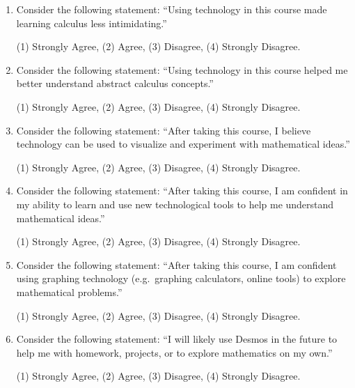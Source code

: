 \documentclass[11pt]{article}
\begin{document}
\begin{enumerate}[{$\qquad 1.]
\item Consider the following statement: ``Using technology in this course made learning calculus less intimidating.''
\begin{center} 
(1) Strongly Agree, \qquad (2) Agree, \qquad (3) Disagree, \qquad (4) Strongly Disagree. \end{center}

\item Consider the following statement: ``Using technology in this course helped me better understand abstract calculus concepts.''
\begin{center} 
(1) Strongly Agree, \qquad (2) Agree, \qquad (3) Disagree, \qquad (4) Strongly Disagree. \end{center}

\item Consider the following statement: ``After taking this course, I believe technology can be used to visualize and experiment with mathematical ideas.''
\begin{center} 
(1) Strongly Agree, \qquad (2) Agree, \qquad (3) Disagree, \qquad (4) Strongly Disagree. \end{center}

	\pagebreak 

\thispagestyle{empty}

\item Consider the following statement: ``After taking this course, I am confident in my ability to learn and use new technological tools to help me understand mathematical ideas.''
\begin{center} 
(1) Strongly Agree, \qquad (2) Agree, \qquad (3) Disagree, \qquad (4) Strongly Disagree. \end{center}

\item Consider the following statement: ``After taking this course, I am confident using graphing technology (e.g.~graphing calculators, online tools) to explore mathematical problems.''
\begin{center} 
(1) Strongly Agree, \qquad (2) Agree, \qquad (3) Disagree, \qquad (4) Strongly Disagree. \end{center}


\item Consider the following statement: ``I will likely use Desmos in the future to help me with homework, projects, or to explore mathematics on my own.''
\begin{center} 
(1) Strongly Agree, \qquad (2) Agree, \qquad (3) Disagree, \qquad (4) Strongly Disagree. \end{center}


\end{enumerate}
\end{document}
